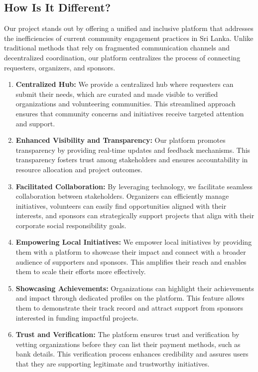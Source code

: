 \subsection{How Is It Different?}
Our project stands out by offering a unified and inclusive platform that addresses the inefficiencies of current community engagement practices in Sri Lanka. Unlike traditional methods that rely on fragmented communication channels and decentralized coordination, our platform centralizes the process of connecting requesters, organizers, and sponsors.
\begin{enumerate}
    \item \textbf{Centralized Hub:} We provide a centralized hub where requesters can submit their needs, which are curated and made visible to verified organizations and volunteering communities. This streamlined approach ensures that community concerns and initiatives receive targeted attention and support.
    \item \textbf{Enhanced Visibility and Transparency:} Our platform promotes transparency by providing real-time updates and feedback mechanisms. This transparency fosters trust among stakeholders and ensures accountability in resource allocation and project outcomes.
    
    \item \textbf{Facilitated Collaboration:} By leveraging technology, we facilitate seamless collaboration between stakeholders. Organizers can efficiently manage initiatives, volunteers can easily find opportunities aligned with their interests, and sponsors can strategically support projects that align with their corporate social responsibility goals.
    
    \item \textbf{Empowering Local Initiatives:} We empower local initiatives by providing them with a platform to showcase their impact and connect with a broader audience of supporters and sponsors. This amplifies their reach and enables them to scale their efforts more effectively.
    
    \item \textbf{Showcasing Achievements:} Organizations can highlight their achievements and impact through dedicated profiles on the platform. This feature allows them to demonstrate their track record and attract support from sponsors interested in funding impactful projects.
    
    \item \textbf{Trust and Verification:} The platform ensures trust and verification by vetting organizations before they can list their payment methods, such as bank details. This verification process enhances credibility and assures users that they are supporting legitimate and trustworthy initiatives.


\end{enumerate}
